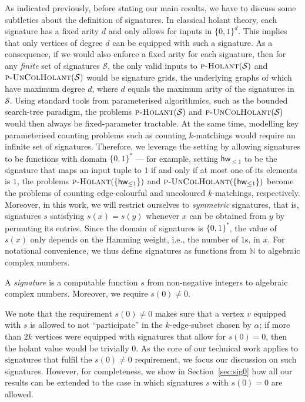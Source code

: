 \documentclass[authorcolumns,numberwithinsect]{no-lipics-v2022}
\newcommand{\holantprob}{\text{\sc{p-Holant}}}
\begin{document}
As indicated previously, before stating our main results, we have to discuss some subtleties about the definition of signatures. In classical holant theory, each signature has a fixed arity $d$ and only allows for inputs in $\{0,1\}^d$. This implies that only vertices of degree $d$ can be equipped with such a signature. As a consequence, if we would also enforce a fixed arity for each signature, then for any \emph{finite} set of signatures $\mathcal{S}$, the only valid inputs to $\holantprob(\mathcal{S})$ and $\text{\sc{p-UnColHolant}}(\mathcal{S})$ would be signature grids, the underlying graphs of which have maximum degree $d$, where $d$ equals the maximum arity of the signatures in $\mathcal{S}$. Using standard tools from parameterised algorithmics, such as the bounded search-tree paradigm, the problems $\holantprob(\mathcal{S})$ and $\text{\sc{p-UnColHolant}}(\mathcal{S})$ would then always be fixed-parameter tractable. At the same time, modelling key parameterised counting problems such as counting $k$-matchings would require an infinite set of signatures. Therefore, we leverage the setting by allowing signatures to be functions with domain $\{0,1\}^\ast$ --- for example, setting $\mathsf{hw}_{\leq 1}$ to be the signature that maps an input tuple to $1$ if and only if at most one of its elements is $1$, the problems $\holantprob(\{\mathsf{hw}_{\leq 1}\})$ and $\text{\sc{p-UnColHolant}}(\{\mathsf{hw}_{\leq 1}\})$ become the problems of counting edge-colourful and uncoloured $k$-matchings, respectively. Moreover, in this work, we will restrict ourselves to \emph{symmetric} signatures, that is, signatures $s$ satisfying $s(x)=s(y)$ whenever $x$ can be obtained from $y$ by permuting its entries. Since the domain of signatures is $\{0,1\}^\ast$, the value of $s(x)$ only depends on the Hamming weight, i.e., the number of $1$s, in $x$. For notational convenience, we thus define signatures as functions from $\mathbb{N}$ to algebraic complex numbers.

\begin{definition}[Signatures]\label{def:signatures_intro}
    A \emph{signature} is a computable function $s$ from non-negative integers to algebraic complex numbers. Moreover, we require $s(0)\neq 0$.
\end{definition}
We note that the requirement $s(0)\neq 0$ makes sure that a vertex $v$ equipped with $s$ is allowed to not ``participate'' in the $k$-edge-subset chosen by $\alpha$; 
if more than $2k$ vertices were equipped with signatures that allow for $s(0)=0$, then the holant value would be trivially $0$.
As the core of our technical work applies to signatures that fulfil the $s(0)\neq0$ requirement, we focus our discussion on such signatures.
However, for completeness, we show in Section~\ref{sec:sig0} how all our results can be extended to the case in which signatures $s$ with $s(0)=0$ are allowed.
\end{document}
